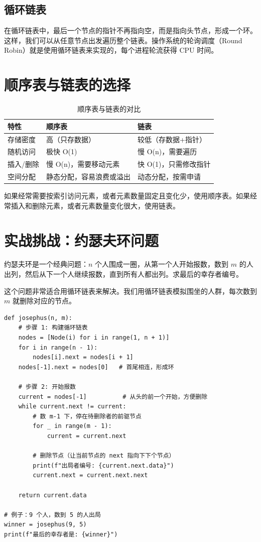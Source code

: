 \subsection{循环链表}

在循环链表中，最后一个节点的指针不再指向空，而是指向头节点，形成一个环。这样，我们可以从任意节点出发遍历整个链表。操作系统的轮询调度（Round Robin）就是使用循环链表来实现的，每个进程轮流获得 CPU 时间。

\section{顺序表与链表的选择}

\begin{table}[h]
\centering
\begin{tabular}{|l|l|l|}
\hline
\textbf{特性} & \textbf{顺序表} & \textbf{链表} \\
\hline
存储密度 & 高（只存数据） & 较低（存数据+指针） \\
随机访问 & 极快 O(1) & 慢 O(n)，需要遍历 \\
插入/删除 & 慢 O(n)，需要移动元素 & 快 O(1)，只需修改指针 \\
空间分配 & 静态分配，容易浪费或溢出 & 动态分配，按需申请 \\
\hline
\end{tabular}
\caption{顺序表与链表的对比}
\end{table}

如果经常需要按索引访问元素，或者元素数量固定且变化少，使用顺序表。如果经常插入和删除元素，或者元素数量变化很大，使用链表。

\section{实战挑战：约瑟夫环问题}

约瑟夫环是一个经典问题：\(n\) 个人围成一圈，从第一个人开始报数，数到 \(m\) 的人出列，然后从下一个人继续报数，直到所有人都出列。求最后的幸存者编号。

这个问题非常适合用循环链表来解决。我们用循环链表模拟围坐的人群，每次数到 \(m\) 就删除对应的节点。

\begin{verbatim}
def josephus(n, m):
    # 步骤 1: 构建循环链表
    nodes = [Node(i) for i in range(1, n + 1)]
    for i in range(n - 1):
        nodes[i].next = nodes[i + 1]
    nodes[-1].next = nodes[0]   # 首尾相连，形成环

    # 步骤 2: 开始报数
    current = nodes[-1]          # 从头的前一个开始，方便删除
    while current.next != current:
        # 数 m-1 下，停在待删除者的前驱节点
        for _ in range(m - 1):
            current = current.next

        # 删除节点（让当前节点的 next 指向下下个节点）
        print(f"出局者编号: {current.next.data}")
        current.next = current.next.next

    return current.data

# 例子：9 个人，数到 5 的人出局
winner = josephus(9, 5)
print(f"最后的幸存者是: {winner}")
\end{verbatim}

